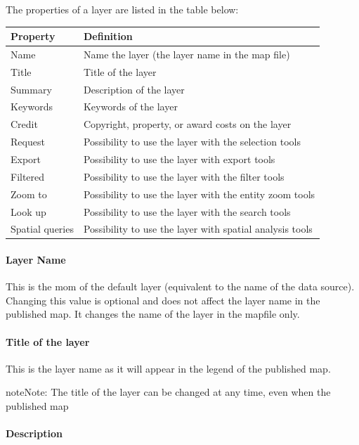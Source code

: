 \documentclass[letterpaper,10pt,english]{sphinxmanual}
\begin{document}
The properties of a layer are listed in the table below:

\begin{tabulary}{\linewidth}{|L|L|}
\hline

\textbf{Property}
 & 
\textbf{Definition}
\\
\hline
Name
 & 
Name the layer (the layer name in the map file)
\\
\hline
Title
 & 
Title of the layer
\\
\hline
Summary
 & 
Description of the layer
\\
\hline
Keywords
 & 
Keywords of the layer
\\
\hline
Credit
 & 
Copyright, property, or award costs on the layer
\\
\hline
Request
 & 
Possibility to use the layer with the selection tools
\\
\hline
Export
 & 
Possibility to use the layer with export tools
\\
\hline
Filtered
 & 
Possibility to use the layer with the filter tools
\\
\hline
Zoom to
 & 
Possibility to use the layer with the entity zoom tools
\\
\hline
Look up
 & 
Possibility to use the layer with the search tools
\\
\hline
Spatial queries
 & 
Possibility to use the layer with spatial analysis tools
\\
\hline\end{tabulary}

\paragraph{Layer Name}

This is the mom of the default layer (equivalent to the name of the data source). Changing this value is optional and does not affect the layer name in the published map. It changes the name of the layer in the mapfile only.
\paragraph{Title of the layer}

This is the layer name as it will appear in the legend of the published map.

\begin{notice}{note}{Note:}
The title of the layer can be changed at any time, even when the published map
\end{notice}
\paragraph{Description}
\end{document}
